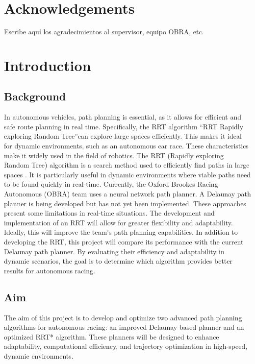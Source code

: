\documentclass[a4paper,11pt]{report}
\begin{document}
\chapter*{Acknowledgements}
Escribe aquí los agradecimientos al supervisor, equipo OBRA, etc.
\newpage

\chapter{Introduction}
\section{Background}

In autonomous vehicles, path planning is essential, as it allows for efficient and safe route
planning in real time. Specifically, the RRT algorithm \textquotedblleft RRT Rapidly exploring Random
Tree\textquotedblright can explore large spaces efficiently. This makes it ideal for dynamic environments,
such as an autonomous car race. These characteristics make it widely used in the field
of robotics. The RRT (Rapidly exploring Random Tree) algorithm is a search method
used to efficiently find paths in large spaces \cite{reference1}. It is particularly useful in dynamic
environments where viable paths need to be found quickly in real-time. Currently, the
Oxford Brookes Racing Autonomous (OBRA) team uses a neural network path planner.
A Delaunay path planner is being developed but has not yet been implemented. These
approaches present some limitations in real-time situations. The development and implementation of an RRT \cite{reference2} will allow for greater flexibility and adaptability. Ideally, this
will improve the team’s path planning capabilities. In addition to developing the RRT,
this project will compare its performance with the current Delaunay path planner. By
evaluating their efficiency and adaptability in dynamic scenarios, the goal is to determine
which algorithm provides better results for autonomous racing.

\section{Aim}
The aim of this project is to develop and optimize two advanced path planning algorithms for autonomous racing: an improved Delaunay-based planner and an optimized RRT* algorithm. These planners will be designed to enhance adaptability, computational efficiency, and trajectory optimization in high-speed, dynamic environments. 
\end{document}
